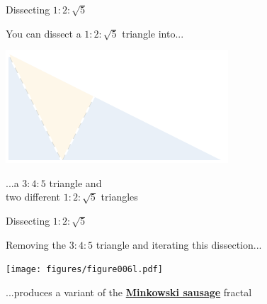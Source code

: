 \documentclass[14pt]{beamer}
\begin{document}
    \begin{frame}{Dissecting $1\!\!:\!\!2\!\!:\!\!\sqrt{5}$}
        \begin{center}
            You can dissect a $1\!\!:\!\!2\!\!:\!\!\sqrt{5}$ triangle into...

            \bigskip \bigskip

            \includegraphics[height=18ex]{figures/figure006i.pdf}

            \bigskip \bigskip

            ...a $3\!\!:\!\!4\!\!:\!\!5$ triangle and\\two different $1\!\!:\!\!2\!\!:\!\!\sqrt{5}$ triangles
        \end{center}
    \end{frame}


    \begin{frame}{Dissecting $1\!\!:\!\!2\!\!:\!\!\sqrt{5}$}
        \begin{center}
            Removing the $3\!\!:\!\!4\!\!:\!\!5$ triangle and iterating this dissection...

            \bigskip \bigskip

            \texttt{[image: figures/figure006l.pdf]}

            \bigskip \bigskip

            ...produces a variant of the \textbf{\href{https://en.wikipedia.org/wiki/Minkowski_sausage}{Minkowski sausage}} fractal\\[4ex]
        \end{center}
    \end{frame}

\end{document}
